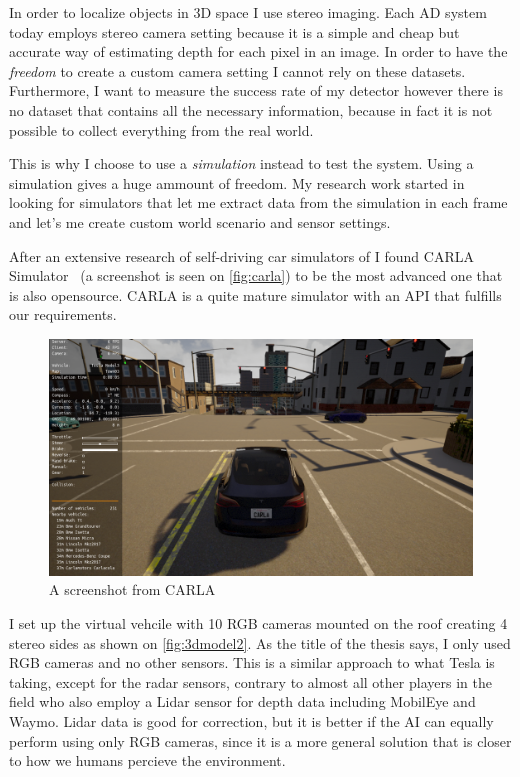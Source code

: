 In order to localize objects in 3D space I use stereo imaging. Each AD system
today employs stereo camera setting because it is a simple and cheap but
accurate way of estimating depth for each pixel in an image. In order to have
the \emph{freedom} to create a custom camera setting I cannot rely on these
datasets. Furthermore, I want to measure the success rate of my detector however
there is no dataset that contains all the necessary information, because in fact
it is not possible to collect everything from the real world.

This is why I choose to use a \emph{simulation} instead to test the system.
Using a simulation gives a huge ammount of freedom. My research work started
in looking for simulators that let me extract data from the simulation in each
frame and let's me create custom world scenario and sensor settings. 

After an extensive research of self-driving car simulators of I found CARLA
Simulator~\cite{Dosovitskiy17} (a
screenshot is seen on \autoref{fig:carla}) to be the most advanced one that is
also opensource. CARLA is a quite mature simulator with an API that
fulfills our requirements.

\begin{figure}[!ht]
    \centering
    \includegraphics[width=150mm, keepaspectratio]{figures/carla.png}
    \caption{A screenshot from CARLA}
    \label{fig:carla}
\end{figure}

I set up the virtual vehcile with 10 RGB cameras mounted on the roof creating 4
stereo sides as shown on \autoref{fig:3dmodel2}. As the title of the thesis
says, I only used RGB cameras and no other sensors. This is a similar approach
to what Tesla is taking, except for the radar sensors, contrary to almost all
other players in the field who also employ a Lidar sensor for depth data
including MobilEye and Waymo. Lidar data is good for correction, but it is
better if the AI can equally perform using only RGB cameras, since it is a more
general solution that is closer to how we humans percieve the environment.

